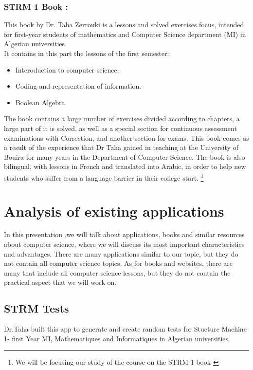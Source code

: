 \subsubsection{STRM 1 Book :}
This book by Dr. Taha Zerrouki is a lessons and solved exercises focus, intended for first-year students of mathematics and Computer Science department (MI) in 
Algerian universities.\cite{STRM-1-Book-Taha-Zerrouki}\\
It contains in this part the lessons of the first semester:
\begin{itemize}
	\item Interoduction to computer science.
	\item Coding and representation of information.
	\item Boolean Algebra.
\end{itemize}
The book contains a large number of exercises divided according to chapters, a large part of it is solved, as well as a special section for continuous assessment examinations with
Correction, and another section for exams.
This book comes as a result of the experience that Dr Taha gained in teaching at the University of Bouira for many years in the Department of Computer Science.
The book is also bilingual, with lessons in French and translated into Arabic, in order to help new students who suffer from a language barrier in their college start.
\footnote{We will be focusing our study of the course on the STRM 1 book \cite{STRM-1-Book-Taha-Zerrouki}}


 \section{Analysis of existing applications}
 In this presentation ,we will talk about applications, books and similar resources about computer science, 
 where we will discuss its most important characteristics and advantages.
 There are many applications similar to our topic, but they do not contain all computer science topics.
 As for books and websites, there are many that include all computer science lessons, but they do not 
 contain the practical aspect that we will work on.
 

 \subsection{STRM Tests}
 Dr.Taha built this app to generate and create random tests for Stucture Machine 1- first Year MI, Mathematiques and Informatiques
  in Algerian universities.\cite{STRM-Tests}
 
